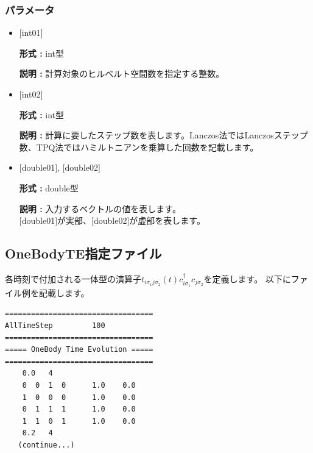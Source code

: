 \subsubsection{パラメータ}
 \begin{itemize}

  \item  $[$int01$]$

 {\bf 形式 :} int型

{\bf 説明 :} 計算対象のヒルベルト空間数を指定する整数。

  \item  $[$int02$]$

 {\bf 形式 :} int型

{\bf 説明 :} { 計算に要したステップ数を表します。Lanczos法ではLanczosステップ数、TPQ法ではハミルトニアンを乗算した回数を記載します。}
 
 \item  $[$double01$]$, $[$double02$]$

 {\bf 形式 :} double型 

{\bf 説明 :} 入力するベクトルの値を表します。\\
$[$double01$]$が実部、$[$double02$]$が虚部を表します。\\
\end{itemize}

\newpage
\subsection{{OneBodyTE指定ファイル}}
\label{Subsec:1TE}
各時刻で付加される一体型の演算子$t_{i\sigma_1 j \sigma_2}(t)c_{i\sigma_1}^{\dagger}c_{j\sigma_2}$を定義します。
以下にファイル例を記載します。

\begin{minipage}{12.5cm}
\begin{screen}
\begin{verbatim}
==================================
AllTimeStep         100
==================================
===== OneBody Time Evolution =====
==================================
    0.0   4
    0  0  1  0      1.0    0.0
    1  0  0  0      1.0    0.0
    0  1  1  1      1.0    0.0
    1  1  0  1      1.0    0.0
    0.2   4
   (continue...)
\end{verbatim}
\end{screen}
\end{minipage}

